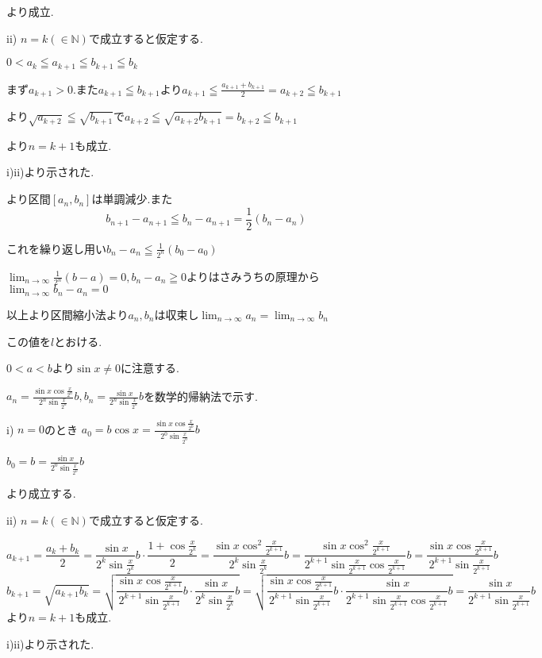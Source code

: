 \documentclass{jsarticle}
\begin{document}
より成立.

ii) $n=k(\in\mathbb{N})$で成立すると仮定する.

$0<a_k\leqq a_{k+1}\leqq b_{k+1} \leqq b_k$

まず$a_{k+1}>0$.また$a_{k+1}\leqq b_{k+1}$より$a_{k+1}\leqq \frac{a_{k+1}+b_{k+1}}{2}=a_{k+2}\leqq b_{k+1}$

より$\sqrt{a_{k+2}} \leqq \sqrt{b_{k+1}}$で$a_{k+2}\leqq\sqrt{a_{k+2}b_{k+1}}=b_{k+2}\leqq b_{k+1}$

より$n=k+1$も成立.

i)ii)より示された.

より区間$[a_n,b_n]$は単調減少.また
\[b_{n+1}-a_{n+1}\leqq b_n-a_{n+1}=\frac{1}{2}(b_n-a_n)\]

これを繰り返し用い$b_n-a_n\leqq \frac{1}{2^n}(b_0-a_0)$

$\displaystyle \lim_{n\to\infty}\frac{1}{2^n}(b-a)=0,b_n-a_n\geqq 0$よりはさみうちの原理から$\displaystyle \lim_{n\to\infty}b_n-a_n=0$

以上より区間縮小法より$a_n,b_n$は収束し$\displaystyle \lim_{n\to \infty}a_n=\lim_{n\to\infty}b_n$

この値を$l$とおける.

$0<a<b$より$\sin x\neq 0$に注意する.

$a_n = \frac{\sin x\cos \frac{x}{2^n}}{2^n\sin \frac{x}{2^n}}b,b_n= \frac{\sin x}{2^n\sin \frac{x}{2^n}}b$を数学的帰納法で示す.

i) $n=0$のとき
$a_0=b\cos x = \frac{\sin x \cos \frac{x}{2^0}}{2^0\sin\frac{x}{2^0}}b$

$b_0=b = \frac{\sin x}{2^0\sin\frac{x}{2^0}}b$

より成立する.

ii) $n=k(\in \mathbb{N})$で成立すると仮定する.

\[a_{k+1}=\frac{a_k+b_k}{2}=\frac{\sin x}{2^k\sin \frac{x}{2^k}}b\cdot \frac{1+\cos \frac{x}{2^k}}{2}= \frac{\sin x\cos ^2 \frac{x}{2^{k+1}}}{2^k\sin \frac{x}{2^k}}b= \frac{\sin x\cos ^2 \frac{x}{2^{k+1}}}{2^{k+1}\sin \frac{x}{2^{k+1}}\cos \frac{x}{2^{k+1}}}b=\frac{\sin x\cos \frac{x}{2^{k+1}}}{2^{k+1}\sin \frac{x}{2^{k+1}}}b\]
\[b_{k+1}=\sqrt{a_{k+1}b_k}=\sqrt{\frac{\sin x\cos \frac{x}{2^{k+1}}}{2^{k+1}\sin \frac{x}{2^{k+1}}}b\cdot \frac{\sin x}{2^k\sin \frac{x}{2^k}}b}=\sqrt{\frac{\sin x\cos \frac{x}{2^{k+1}}}{2^{k+1}\sin \frac{x}{2^{k+1}}}b\cdot \frac{\sin x}{2^{k+1}\sin \frac{x}{2^{k+1}}\cos \frac{x}{2^{k+1}}}b}= \frac{\sin x}{2^{k+1}\sin \frac{x}{2^{k+1}}}b\]
より$n=k+1$も成立.

i)ii)より示された.
\end{document}
